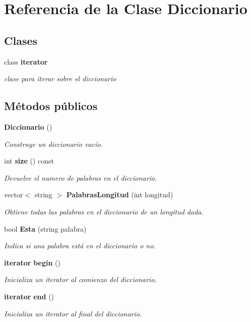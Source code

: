 \section{Referencia de la Clase Diccionario}
\label{classDiccionario}
\subsection*{Clases}
\begin{DoxyCompactItemize}
\item 
class \textbf{ iterator}
\begin{DoxyCompactList}\small\item\em clase para iterar sobre el diccionario \end{DoxyCompactList}\end{DoxyCompactItemize}
\subsection*{Métodos públicos}
\begin{DoxyCompactItemize}
\item 
\mbox{\label{classDiccionario_aa0a2191ec706b256c35b5229cc197b15}} 
\textbf{ Diccionario} ()
\begin{DoxyCompactList}\small\item\em Construye un diccionario vacío. \end{DoxyCompactList}\item 
\mbox{\label{classDiccionario_a74ea14ecba52288b84ffc6ea1f2fba99}} 
int \textbf{ size} () const
\begin{DoxyCompactList}\small\item\em Devuelve el numero de palabras en el diccionario. \end{DoxyCompactList}\item 
vector$<$ string $>$ \textbf{ Palabras\+Longitud} (int longitud)
\begin{DoxyCompactList}\small\item\em Obtiene todas las palabras en el diccionario de un longitud dada. \end{DoxyCompactList}\item 
bool \textbf{ Esta} (string palabra)
\begin{DoxyCompactList}\small\item\em Indica si una palabra está en el diccionario o no. \end{DoxyCompactList}\item 
\mbox{\label{classDiccionario_a3f42d480e74efbd66b8837d0ea1e491d}} 
\textbf{ iterator} \textbf{ begin} ()
\begin{DoxyCompactList}\small\item\em Inicializa un iterator al comienzo del diccionario. \end{DoxyCompactList}\item 
\mbox{\label{classDiccionario_abe91cc666c92f7f003507a82bdcd8c35}} 
\textbf{ iterator} \textbf{ end} ()
\begin{DoxyCompactList}\small\item\em Inicializa un iterator al final del diccionario. \end{DoxyCompactList}\end{DoxyCompactItemize}
